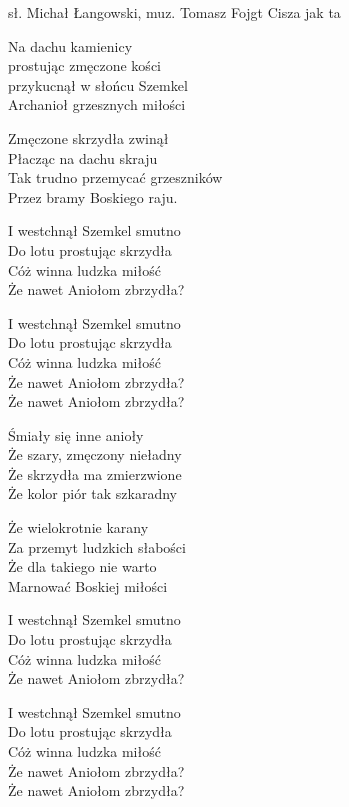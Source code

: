 {sł. Michał Łangowski, muz. Tomasz Fojgt}
{Cisza jak ta}
\begin{text}
\hfill\break
\hfill\break
\ifOneCol \else \hfill\break \fi
Na dachu kamienicy\\
prostując zmęczone kości\\
przykucnął w słońcu Szemkel\\
Archanioł grzesznych miłości

Zmęczone skrzydła zwinął\\
Płacząc na dachu skraju\\
Tak trudno przemycać grzeszników\\
Przez bramy Boskiego raju.

\vin I westchnął Szemkel smutno\\
\vin Do lotu prostując skrzydła\\
\vin Cóż winna ludzka miłość\\
\vin Że nawet Aniołom zbrzydła?

\vin I westchnął Szemkel smutno\\
\vin Do lotu prostując skrzydła\\
\vin Cóż winna ludzka miłość\\
\vin Że nawet Aniołom zbrzydła?\\
\vin Że nawet Aniołom zbrzydła?

\hfill\break
\ifOneCol \else \hfill\break \fi
Śmiały się inne anioły\\
Że szary, zmęczony nieładny\\
Że skrzydła ma zmierzwione\\
Że kolor piór tak szkaradny

Że wielokrotnie karany\\
Za przemyt ludzkich słabości\\
Że dla takiego nie warto\\
Marnować Boskiej miłości

\vin I westchnął Szemkel smutno\\
\vin Do lotu prostując skrzydła\\
\vin Cóż winna ludzka miłość\\
\vin Że nawet Aniołom zbrzydła?

\vin I westchnął Szemkel smutno\\
\vin Do lotu prostując skrzydła\\
\vin Cóż winna ludzka miłość\\
\vin Że nawet Aniołom zbrzydła?\\
\vin Że nawet Aniołom zbrzydła?
\end{text}
